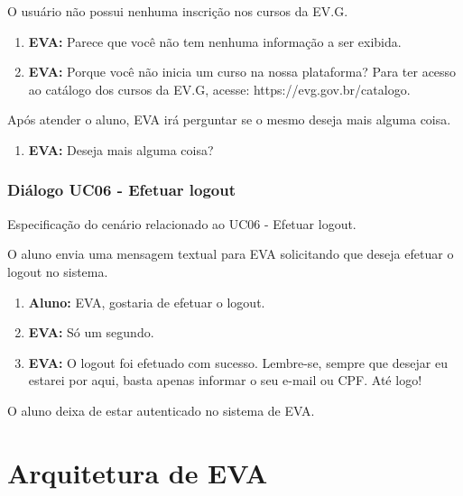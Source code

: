     
O usuário não possui nenhuma inscrição nos cursos da EV.G.
    
\begin{enumerate}[label=\alph*)]
        \tightlist
    \item \textbf{EVA:} Parece que você não tem nenhuma informação a ser exibida.
    \item \textbf{EVA:} Porque você não inicia um curso na nossa plataforma? Para ter acesso ao catálogo dos cursos da EV.G, acesse: https://evg.gov.br/catalogo.
\end{enumerate}
    
    
Após atender o aluno, EVA irá perguntar se o mesmo deseja mais alguma coisa.
        
\begin{enumerate}[label=\alph*)]
        \tightlist
        \item \textbf{EVA:} Deseja mais alguma coisa?
\end{enumerate}

\subsubsection{Diálogo UC06 - Efetuar logout}

Especificação do cenário relacionado ao UC06 - Efetuar logout.

    
O aluno envia uma mensagem textual para EVA solicitando que deseja efetuar o logout no sistema.
        
\begin{enumerate}[label=\alph*)]
        \tightlist
    \item \textbf{Aluno:} EVA, gostaria de efetuar o logout.
    \item \textbf{EVA:} Só um segundo.
    \item \textbf{EVA:} O logout foi efetuado com sucesso. Lembre-se, sempre que desejar eu estarei por aqui, basta apenas informar o seu e-mail ou CPF. Até logo!
\end{enumerate}
    
    
O aluno deixa de estar autenticado no sistema de EVA.


\section{Arquitetura de EVA}

